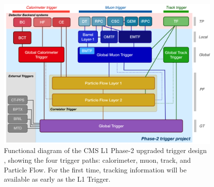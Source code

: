 \begin{figure}[ht]
    \centering
    \includegraphics[width=15cm]{figures/ch-3-phase2/phase-2-l1-architecture.png}
    \caption[Functional diagram of the CMS L1 Phase-2 upgraded trigger design.]{Functional diagram of the CMS L1 Phase-2 upgraded trigger design \cite{CMS-TDR-021}, showing the four trigger paths: calorimeter, muon, track, and Particle Flow. For the first time, tracking information will be available as early as the L1 Trigger.}
    \label{fig:phase-2-l1-architecture}
\end{figure}

